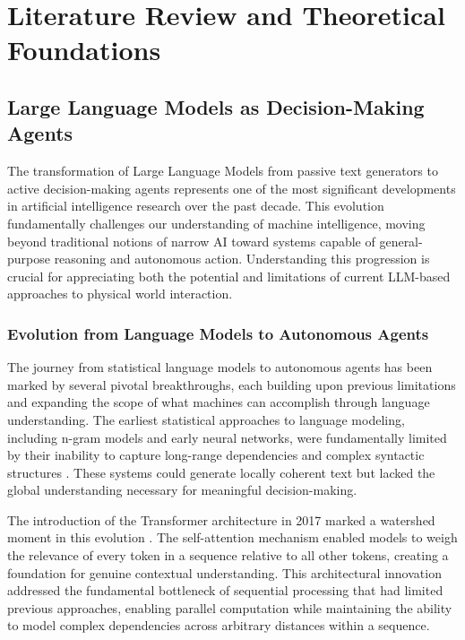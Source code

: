 
\chapter{Literature Review and Theoretical Foundations} \label{chp:literature}


\section{Large Language Models as Decision-Making Agents}

The transformation of Large Language Models from passive text generators to active decision-making agents represents one of the most significant developments in artificial intelligence research over the past decade. This evolution fundamentally challenges our understanding of machine intelligence, moving beyond traditional notions of narrow AI toward systems capable of general-purpose reasoning and autonomous action. Understanding this progression is crucial for appreciating both the potential and limitations of current LLM-based approaches to physical world interaction.

\subsection{Evolution from Language Models to Autonomous Agents}

The journey from statistical language models to autonomous agents has been marked by several pivotal breakthroughs, each building upon previous limitations and expanding the scope of what machines can accomplish through language understanding. The earliest statistical approaches to language modeling, including n-gram models and early neural networks, were fundamentally limited by their inability to capture long-range dependencies and complex syntactic structures \cite{bengio2003neural}. These systems could generate locally coherent text but lacked the global understanding necessary for meaningful decision-making.

The introduction of the Transformer architecture in 2017 marked a watershed moment in this evolution \cite{vaswani2017attention}. The self-attention mechanism enabled models to weigh the relevance of every token in a sequence relative to all other tokens, creating a foundation for genuine contextual understanding. This architectural innovation addressed the fundamental bottleneck of sequential processing that had limited previous approaches, enabling parallel computation while maintaining the ability to model complex dependencies across arbitrary distances within a sequence.

